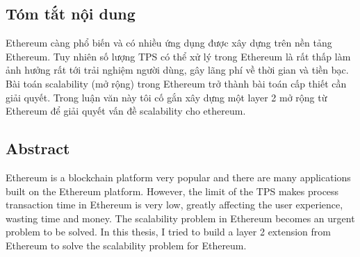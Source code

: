 
\begin{centering}
	\section*{Tóm tắt nội dung}
\end{centering}

Ethereum càng phổ biến và có nhiều ứng dụng được xây dựng trên nền tảng Ethereum. Tuy nhiên số lượng TPS có thể xử lý trong Ethereum là rất thấp làm ảnh hưởng rất tới trải nghiệm người dùng, gây lãng phí về thời gian và tiền bạc. Bài toán scalability (mở rộng) trong Ethereum trở thành bài toán cấp thiết cần giải quyết. Trong luận văn này tôi cố gắn xây dựng một layer 2 mở rộng từ Ethereum để giải quyết vấn đề scalability cho ethereum.



\begin{centering}
	\section*{Abstract}
\end{centering}

Ethereum is a blockchain platform very popular and there are many applications built on the Ethereum platform. However, the limit of the TPS makes process transaction time in Ethereum is very low, greatly affecting the user experience, wasting time and money. The scalability problem in Ethereum becomes an urgent problem to be solved. In this thesis, I tried to build a layer 2 extension from Ethereum to solve the scalability problem for Ethereum.